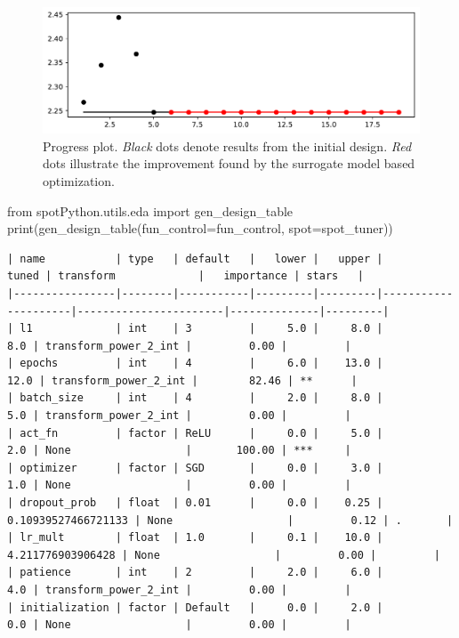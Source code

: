 \documentclass[
  letterpaper,
  DIV=11,
  numbers=noendperiod]{scrreprt}
\newenvironment{Shaded}{\begin{snugshade}}{\end{snugshade}}
\newcommand{\BuiltInTok}[1]{\textcolor[rgb]{0.00,0.23,0.31}{#1}}
\newcommand{\ImportTok}[1]{\textcolor[rgb]{0.00,0.46,0.62}{#1}}
\newcommand{\NormalTok}[1]{\textcolor[rgb]{0.00,0.23,0.31}{#1}}
\newcommand{\OperatorTok}[1]{\textcolor[rgb]{0.37,0.37,0.37}{#1}}
\begin{document}
\begin{figure}[H]

{\centering \includegraphics{31_spot_lightning_csv_files/figure-pdf/cell-13-output-1.pdf}

}

\caption{Progress plot. \emph{Black} dots denote results from the
initial design. \emph{Red} dots illustrate the improvement found by the
surrogate model based optimization.}

\end{figure}

\begin{Shaded}
\begin{Highlighting}[]
\ImportTok{from}\NormalTok{ spotPython.utils.eda }\ImportTok{import}\NormalTok{ gen\_design\_table}
\BuiltInTok{print}\NormalTok{(gen\_design\_table(fun\_control}\OperatorTok{=}\NormalTok{fun\_control, spot}\OperatorTok{=}\NormalTok{spot\_tuner))}
\end{Highlighting}
\end{Shaded}

\begin{verbatim}
| name           | type   | default   |   lower |   upper |               tuned | transform             |   importance | stars   |
|----------------|--------|-----------|---------|---------|---------------------|-----------------------|--------------|---------|
| l1             | int    | 3         |     5.0 |     8.0 |                 8.0 | transform_power_2_int |         0.00 |         |
| epochs         | int    | 4         |     6.0 |    13.0 |                12.0 | transform_power_2_int |        82.46 | **      |
| batch_size     | int    | 4         |     2.0 |     8.0 |                 5.0 | transform_power_2_int |         0.00 |         |
| act_fn         | factor | ReLU      |     0.0 |     5.0 |                 2.0 | None                  |       100.00 | ***     |
| optimizer      | factor | SGD       |     0.0 |     3.0 |                 1.0 | None                  |         0.00 |         |
| dropout_prob   | float  | 0.01      |     0.0 |    0.25 | 0.10939527466721133 | None                  |         0.12 | .       |
| lr_mult        | float  | 1.0       |     0.1 |    10.0 |   4.211776903906428 | None                  |         0.00 |         |
| patience       | int    | 2         |     2.0 |     6.0 |                 4.0 | transform_power_2_int |         0.00 |         |
| initialization | factor | Default   |     0.0 |     2.0 |                 0.0 | None                  |         0.00 |         |
\end{verbatim}
\end{document}

